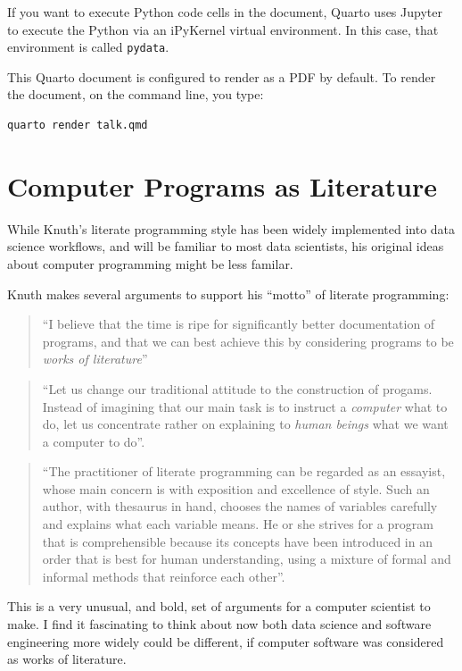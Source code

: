 \documentclass[
  letterpaper,
  DIV=11,
  numbers=noendperiod]{scrartcl}
\begin{document}
If you want to execute Python code cells in the document, Quarto uses
Jupyter to execute the Python via an iPyKernel virtual environment. In
this case, that environment is called \texttt{pydata}.

This Quarto document is configured to render as a PDF by default. To
render the document, on the command line, you type:

\begin{verbatim}
quarto render talk.qmd
\end{verbatim}

\section{Computer Programs as
Literature}\label{computer-programs-as-literature}

While Knuth's literate programming style has been widely implemented
into data science workflows, and will be familiar to most data
scientists, his original ideas about computer programming might be less
familar.

Knuth makes several arguments to support his ``motto'' of literate
programming:

\begin{quote}
``I believe that the time is ripe for significantly better documentation
of programs, and that we can best achieve this by considering programs
to be \emph{works of literature}''
\end{quote}

\begin{quote}
``Let us change our traditional attitude to the construction of progams.
Instead of imagining that our main task is to instruct a \emph{computer}
what to do, let us concentrate rather on explaining to \emph{human
beings} what we want a computer to do''.
\end{quote}

\begin{quote}
``The practitioner of literate programming can be regarded as an
essayist, whose main concern is with exposition and excellence of style.
Such an author, with thesaurus in hand, chooses the names of variables
carefully and explains what each variable means. He or she strives for a
program that is comprehensible because its concepts have been introduced
in an order that is best for human understanding, using a mixture of
formal and informal methods that reinforce each other''.
\end{quote}

This is a very unusual, and bold, set of arguments for a computer
scientist to make. I find it fascinating to think about now both data
science and software engineering more widely could be different, if
computer software was considered as works of literature.
\end{document}
